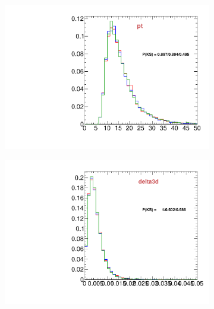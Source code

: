 \begin{figure}
\begin{subfigure}[b]{0.2\textwidth}
                \includegraphics[width=\textwidth]{Figures/VariablesComparison/MC_barrel_figs_3h/pt}
                \label{fig:MC_barrel_pt_3h}
        \end{subfigure}
        \begin{subfigure}[b]{0.2\textwidth}
                \centering
                \includegraphics[width=\textwidth]{Figures/VariablesComparison/MC_barrel_figs_3h/delta3d}
                \label{fig:MC_barrel_delta3d_3h}
        \end{subfigure}
        \begin{subfigure}[b]{0.2\textwidth}
                \centering

\end{subfigure}
\end{figure}
